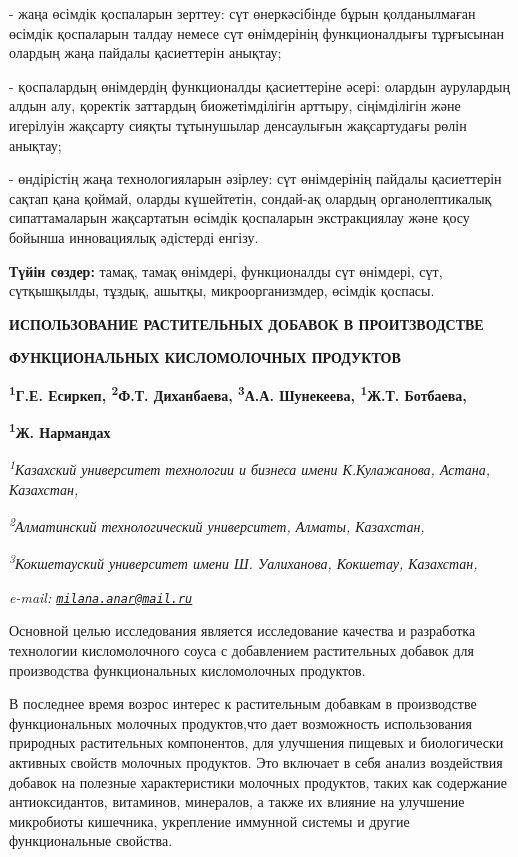 {- жаңа өсімдік қоспаларын зерттеу: сүт өнеркәсібінде бұрын қолданылмаған
өсімдік қоспаларын талдау немесе сүт өнімдерінің функционалдығы
тұрғысынан олардың жаңа пайдалы қасиеттерін анықтау;

- қоспалардың өнімдердің функционалды қасиеттеріне әсері: олардын
аурулардың алдын алу, қоректік заттардың биожетімділігін арттыру,
сіңімділігін және игерілуін жақсарту сияқты тұтынушылар денсаулығын
жақсартудағы рөлін анықтау;

- өндірістің жаңа технологияларын әзірлеу: сүт өнімдерінің пайдалы
қасиеттерін сақтап қана қоймай, оларды күшейтетін, сондай-ақ олардың
органолептикалық сипаттамаларын жақсартатын өсімдік қоспаларын
экстракциялау және қосу бойынша инновациялық әдістерді енгізу.

{\bfseries Түйін сөздер:} тамақ, тамақ өнімдері, функционалды сүт өнімдері,
сүт, сүтқышқылды, тұздық, ашытқы, микроорганизмдер, өсімдік қоспасы.

{\bfseries ИСПОЛЬЗОВАНИЕ РАСТИТЕЛЬНЫХ ДОБАВОК В ПРОИТЗВОДСТВЕ}

{\bfseries ФУНКЦИОНАЛЬНЫХ КИСЛОМОЛОЧНЫХ ПРОДУКТОВ}

{\bfseries \textsuperscript{1}Г.Е. Есиркеп\textsuperscript{\envelope },
\textsuperscript{2}Ф.Т. Диханбаева, \textsuperscript{3}А.А. Шунекеева,
\textsuperscript{1}Ж.Т. Ботбаева,}

{\bfseries \textsuperscript{1}Ж. Нармандах}

\emph{\textsuperscript{1}Казахский университет технологии и бизнеса
имени К.Кулажанова, Астана, Казахстан,}

\emph{\textsuperscript{2}Алматинский технологический университет,
Алматы, Казахстан,}

\emph{\textsuperscript{3}Кокшетауский университет имени Ш. Уалиханова,
Кокшетау, Казахстан,}

\emph{e-mail:
\href{mailto:milana.anar@mail.ru}{\nolinkurl{milana.anar@mail.ru}}}

Основной целью исследования является исследование качества и разработка
технологии кисломолочного соуса с добавлением растительных добавок для
производства функциональных кисломолочных продуктов.

В последнее время возрос интерес к растительным добавкам в производстве
функциональных молочных продуктов,что дает возможность использования
природных растительных компонентов, для улучшения пищевых и биологически
активных свойств молочных продуктов. Это включает в себя анализ
воздействия добавок на полезные характеристики молочных продуктов, таких
как содержание антиоксидантов, витаминов, минералов, а также их влияние
на улучшение микробиоты кишечника, укрепление иммунной системы и другие
функциональные свойства.

}
